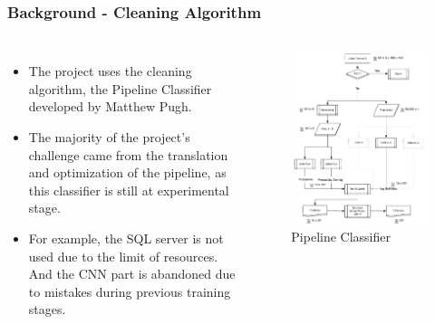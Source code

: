 \documentclass{beamer}[fullspacing]
\begin{document}
\begin{frame}
\frametitle{Background - Cleaning Algorithm}

\begin{columns}
\begin{itemize}
\item
The project uses the cleaning algorithm, the Pipeline Classifier developed by Matthew Pugh\cite{Pugh}. 
\item
The majority of the project's challenge came from the translation and optimization of the pipeline, as this classifier is still at experimental stage.
\item
For example, the SQL server is not used due to the limit of resources.
And the CNN part is abandoned due to mistakes during previous training stages.
\end{itemize}

\begin{figure}
\includegraphics[scale=0.2]{image/pipe.png}
\caption{Pipeline Classifier}
\end{figure}
\end{columns}

\end{frame}
\end{document}

